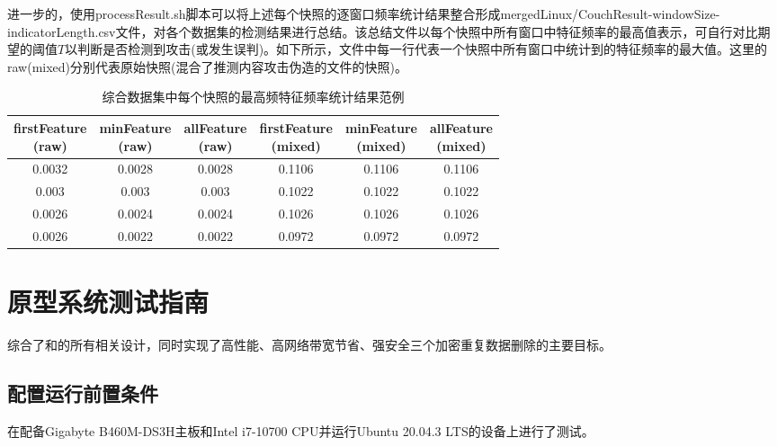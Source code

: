 进一步的，使用processResult.sh脚本可以将上述每个快照的逐窗口频率统计结果整合形成merged{Linux/Couch}Result-{windowSize}-{indicatorLength}.csv文件，对各个数据集的检测结果进行总结。该总结文件以每个快照中所有窗口中特征频率的最高值表示，可自行对比期望的阈值$T$以判断是否检测到攻击(或发生误判)。如下所示，文件中每一行代表一个快照中所有窗口中统计到的特征频率的最大值。这里的raw(mixed)分别代表原始快照(混合了推测内容攻击伪造的文件的快照)。

\begin{table}[!htb]
  \small
  \centering
  \caption{综合数据集中每个快照的最高频特征频率统计结果范例}
  \label{tab:system-detection-snapshot}
  \begin{tabular}{cccccc}
    \toprule
    \makecell[c]{firstFeature                           \\(raw)} & \makecell[c]{minFeature\\(raw)} & \makecell[c]{allFeature\\(raw)} & \makecell[c]{firstFeature\\(mixed)} & \makecell[c]{minFeature\\(mixed)} & \makecell[c]{allFeature\\(mixed)} \\
    \midrule
    0.0032 & 0.0028 & 0.0028 & 0.1106 & 0.1106 & 0.1106 \\
    0.003  & 0.003  & 0.003  & 0.1022 & 0.1022 & 0.1022 \\
    0.0026 & 0.0024 & 0.0024 & 0.1026 & 0.1026 & 0.1026 \\
    0.0026 & 0.0022 & 0.0022 & 0.0972 & 0.0972 & 0.0972 \\
    \bottomrule
  \end{tabular}
\end{table}

\section{\prototype 原型系统测试指南}

\prototype 综合了\sysnameS 和\sysnameF 的所有相关设计，同时实现了高性能、高网络带宽节省、强安全三个加密重复数据删除的主要目标。

\subsection*{配置运行前置条件}

\prototype 在配备Gigabyte B460M-DS3H主板和Intel i7-10700 CPU并运行Ubuntu 20.04.3 LTS的设备上进行了测试。

